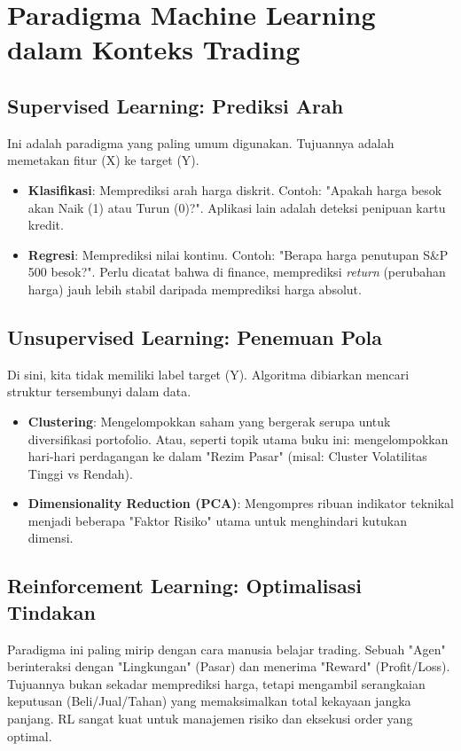 \documentclass[12pt,a4paper]{book}
\begin{document}
\section{Paradigma Machine Learning dalam Konteks Trading}
\subsection{Supervised Learning: Prediksi Arah}
Ini adalah paradigma yang paling umum digunakan. Tujuannya adalah memetakan fitur (X) ke target (Y).
\begin{itemize}
    \item \textbf{Klasifikasi}: Memprediksi arah harga diskrit. Contoh: "Apakah harga besok akan Naik (1) atau Turun (0)?". Aplikasi lain adalah deteksi penipuan kartu kredit.
    \item \textbf{Regresi}: Memprediksi nilai kontinu. Contoh: "Berapa harga penutupan S\&P 500 besok?". Perlu dicatat bahwa di finance, memprediksi \textit{return} (perubahan harga) jauh lebih stabil daripada memprediksi harga absolut.
\end{itemize}

\subsection{Unsupervised Learning: Penemuan Pola}
Di sini, kita tidak memiliki label target (Y). Algoritma dibiarkan mencari struktur tersembunyi dalam data.
\begin{itemize}
    \item \textbf{Clustering}: Mengelompokkan saham yang bergerak serupa untuk diversifikasi portofolio. Atau, seperti topik utama buku ini: mengelompokkan hari-hari perdagangan ke dalam "Rezim Pasar" (misal: Cluster Volatilitas Tinggi vs Rendah).
    \item \textbf{Dimensionality Reduction (PCA)}: Mengompres ribuan indikator teknikal menjadi beberapa "Faktor Risiko" utama untuk menghindari kutukan dimensi.
\end{itemize}

\subsection{Reinforcement Learning: Optimalisasi Tindakan}
Paradigma ini paling mirip dengan cara manusia belajar trading. Sebuah "Agen" berinteraksi dengan "Lingkungan" (Pasar) dan menerima "Reward" (Profit/Loss). Tujuannya bukan sekadar memprediksi harga, tetapi mengambil serangkaian keputusan (Beli/Jual/Tahan) yang memaksimalkan total kekayaan jangka panjang. RL sangat kuat untuk manajemen risiko dan eksekusi order yang optimal.
\end{document}
